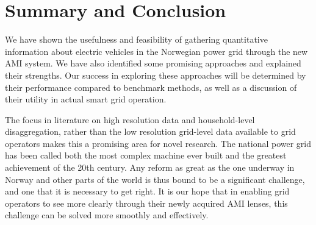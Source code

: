 \documentclass[12pt, american]{article}
\begin{document}
\section{Summary and Conclusion}
We have shown the usefulness and feasibility of gathering quantitative information about electric vehicles in the Norwegian power grid through the new AMI system. We have also identified some promising approaches and explained their strengths. Our success in exploring these approaches will be determined by their performance compared to benchmark methods, as well as a discussion of their utility in actual smart grid operation.

The focus in literature on high resolution data and household-level disaggregation, rather than the low resolution grid-level data available to grid operators makes this a promising area for novel research. The national power grid has been called both the most complex machine ever built and the greatest achievement of the 20th century. Any reform as great as the one underway in Norway and other parts of the world is thus bound to be a significant challenge, and one that it is necessary to get right. It is our hope that in enabling grid operators to see more clearly through their newly acquired AMI lenses, this challenge can be solved more smoothly and effectively.

\pagebreak

{}


\end{document}
